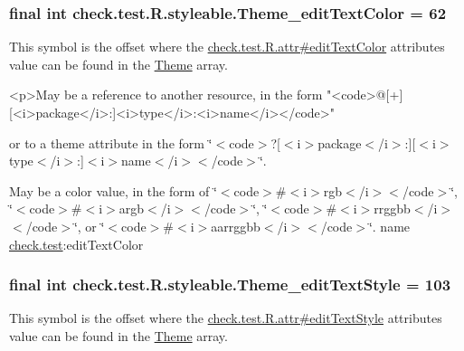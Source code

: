 \subsubsection[{Theme\+\_\+edit\+Text\+Color}]{\setlength{\rightskip}{0pt plus 5cm}final int check.\+test.\+R.\+styleable.\+Theme\+\_\+edit\+Text\+Color = 62\hspace{0.3cm}{\ttfamily [static]}}\label{classcheck_1_1test_1_1_r_1_1styleable_ab8022b2bf8b784e17530f17a05186fa2}
This symbol is the offset where the \hyperlink{classcheck_1_1test_1_1_r_1_1attr_aad21217d13320c22507aeaf702f94f11}{check.\+test.\+R.\+attr\#edit\+Text\+Color} attribute\textquotesingle{}s value can be found in the \hyperlink{classcheck_1_1test_1_1_r_1_1styleable_acca726d02016a0cf607782ec3a436a81}{Theme} array.

\begin{DoxyVerb}      <p>May be a reference to another resource, in the form "<code>@[+][<i>package</i>:]<i>type</i>:<i>name</i></code>"
\end{DoxyVerb}
 or to a theme attribute in the form \char`\"{}$<$code$>$?\mbox{[}$<$i$>$package$<$/i$>$\+:\mbox{]}\mbox{[}$<$i$>$type$<$/i$>$\+:\mbox{]}$<$i$>$name$<$/i$>$$<$/code$>$\char`\"{}. 

May be a color value, in the form of \char`\"{}$<$code$>$\#$<$i$>$rgb$<$/i$>$$<$/code$>$\char`\"{}, \char`\"{}$<$code$>$\#$<$i$>$argb$<$/i$>$$<$/code$>$\char`\"{}, \char`\"{}$<$code$>$\#$<$i$>$rrggbb$<$/i$>$$<$/code$>$\char`\"{}, or \char`\"{}$<$code$>$\#$<$i$>$aarrggbb$<$/i$>$$<$/code$>$\char`\"{}.  name \hyperlink{namespacecheck_1_1test}{check.\+test}\+:edit\+Text\+Color \hypertarget{classcheck_1_1test_1_1_r_1_1styleable_ac901bbf20d4b5142cbf9b03381ae438b}{}
\subsubsection[{Theme\+\_\+edit\+Text\+Style}]{\setlength{\rightskip}{0pt plus 5cm}final int check.\+test.\+R.\+styleable.\+Theme\+\_\+edit\+Text\+Style = 103\hspace{0.3cm}{\ttfamily [static]}}\label{classcheck_1_1test_1_1_r_1_1styleable_ac901bbf20d4b5142cbf9b03381ae438b}
This symbol is the offset where the \hyperlink{classcheck_1_1test_1_1_r_1_1attr_ac6e9f356d0779026955b5bcf35036f7f}{check.\+test.\+R.\+attr\#edit\+Text\+Style} attribute\textquotesingle{}s value can be found in the \hyperlink{classcheck_1_1test_1_1_r_1_1styleable_acca726d02016a0cf607782ec3a436a81}{Theme} array.

